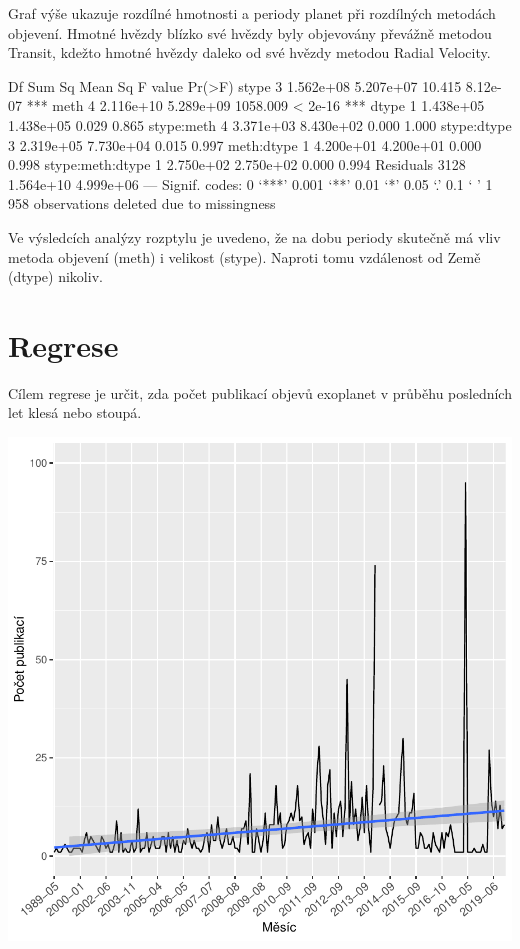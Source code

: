 \documentclass[a4paper,12pt]{article}
\begin{document}
Graf výše ukazuje rozdílné hmotnosti a periody planet při rozdílných metodách objevení. Hmotné hvězdy blízko své hvězdy byly objevovány převážně metodou Transit, kdežto hmotné hvězdy daleko od své hvězdy metodou Radial Velocity.

\begin{Schunk}
\begin{Soutput}
                   Df    Sum Sq   Mean Sq  F value   Pr(>F)    
stype               3 1.562e+08 5.207e+07   10.415 8.12e-07 ***
meth                4 2.116e+10 5.289e+09 1058.009  < 2e-16 ***
dtype               1 1.438e+05 1.438e+05    0.029    0.865    
stype:meth          4 3.371e+03 8.430e+02    0.000    1.000    
stype:dtype         3 2.319e+05 7.730e+04    0.015    0.997    
meth:dtype          1 4.200e+01 4.200e+01    0.000    0.998    
stype:meth:dtype    1 2.750e+02 2.750e+02    0.000    0.994    
Residuals        3128 1.564e+10 4.999e+06                      
---
Signif. codes:  0 ‘***’ 0.001 ‘**’ 0.01 ‘*’ 0.05 ‘.’ 0.1 ‘ ’ 1
958 observations deleted due to missingness
\end{Soutput}
\end{Schunk}

Ve výsledcích analýzy rozptylu je uvedeno, že na dobu periody skutečně má vliv metoda objevení (meth) i velikost (stype). Naproti tomu vzdálenost od Země (dtype) nikoliv.

\newpage

\section{Regrese}

Cílem regrese je určit, zda počet publikací objevů exoplanet v průběhu posledních let klesá nebo stoupá.

\begin{center}
\includegraphics{exoplanety-031}
\end{center}
\end{document}
